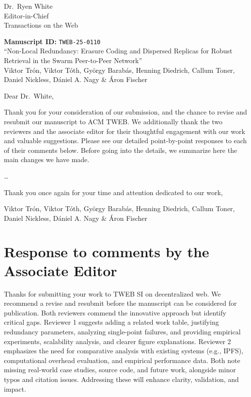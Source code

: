 \documentclass[11pt]{article}
\newcommand{\them}{\it \setlength{\leftskip}{0cm} \setlength{\rightskip}{0cm}}
\begin{document}
\begin{flushright}
  Dr.~Ryen White\\
  Editor-in-Chief\\
  Transactions on the Web
\end{flushright}


\begin{flushleft}
\textbf{Manuscript ID: } \texttt{TWEB-25-0110} \\
``Non-Local Redundancy: Erasure Coding and Dispersed Replicas for Robust Retrieval in the Swarm Peer-to-Peer Network''\\
Viktor Tr\'on, Viktor T\'oth, Gy\"orgy Barab\'as, Henning Diedrich, Callum Toner, Daniel Nickless, D\'{a}niel A. Nagy \& \'{A}ron Fischer
\end{flushleft}


Dear Dr.~White,

Thank you for your consideration of our submission, and the chance to revise and resubmit our manuscript to ACM TWEB. We additionally thank the two reviewers and the associate editor for their thoughtful engagement with our work and valuable suggestions. Please see our detailed point-by-point responses to each of their comments below. Before going into the details, we summarize here the main changes we have made.

\ldots

\bigskip

Thank you once again for your time and attention dedicated to our work,

Viktor Tr\'on, Viktor T\'oth, Gy\"orgy Barab\'as, Henning Diedrich, Callum Toner, Daniel Nickless, D\'{a}niel A. Nagy \& \'{A}ron Fischer



\section*{Response to comments by the Associate Editor}

\them

Thanks for submitting your work to TWEB SI on decentralized web. We recommend a revise and resubmit before the manuscript can be considered for publication. Both reviewers commend the innovative approach but identify critical gaps. Reviewer 1 suggests adding a related work table, justifying redundancy parameters, analyzing single-point failures, and providing empirical experiments, scalability analysis, and clearer figure explanations. Reviewer 2 emphasizes the need for comparative analysis with existing systems (e.g., IPFS), computational overhead evaluation, and empirical performance data. Both note missing real-world case studies, source code, and future work, alongside minor typos and citation issues. Addressing these will enhance clarity, validation, and impact.
\end{document}
